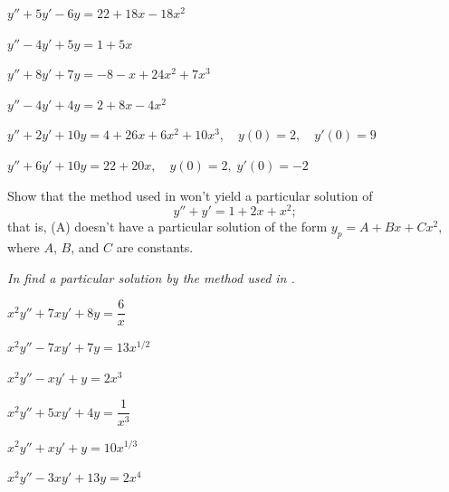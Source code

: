 \begin{exerciselist}

\item\label{exer:5.3.1}$y''+5y'-6y=22+18x-18x^2$

\item\label{exer:5.3.2}$y''-4y'+5y=1+5x$

\item\label{exer:5.3.3}$y''+8y'+7y=-8-x+24x^2+7x^3$

\item\label{exer:5.3.4}$y''-4y'+4y=2+8x-4x^2$

\item\label{exer:5.3.5}\CGex $y''+2y'+10y=4+26x+6x^2+10x^3, \quad  y(0)=2,
\quad y'(0)=9$

\item\label{exer:5.3.6}\CGex $y''+6y'+10y=22+20x, \quad  y(0)=2,\;
y'(0)=-2$

\item\label{exer:5.3.7}Show that the method used in 
won't yield a particular solution of
\[
y''+y'=1+2x+x^2;
\tag{A}
\]
that is,  (A) doesn't have a particular
solution of the form $y_p=A+Bx+Cx^2$, where $A$, $B$, and $C$ are
constants.
\end{exerciselist}
%
\textsl{In  find a
particular solution by the method used in .}

\begin{exerciselistTwoColumn}
\item\label{exer:5.3.8}$x^2y''+7xy'+8y=\dfrac{6}{x}$
\item\label{exer:5.3.9}$x^2y''-7xy'+7y=13x^{1/2}$
\item\label{exer:5.3.10}$x^2y''-xy'+y=2x^3$
\item\label{exer:5.3.11}$x^2y''+5xy'+4y=\dfrac{1}{x^3}$
\item\label{exer:5.3.12}$x^2y''+xy'+y=10x^{1/3}$
\item\label{exer:5.3.13}$x^2y''-3xy'+13y=2x^4$
\end{exerciselistTwoColumn}

